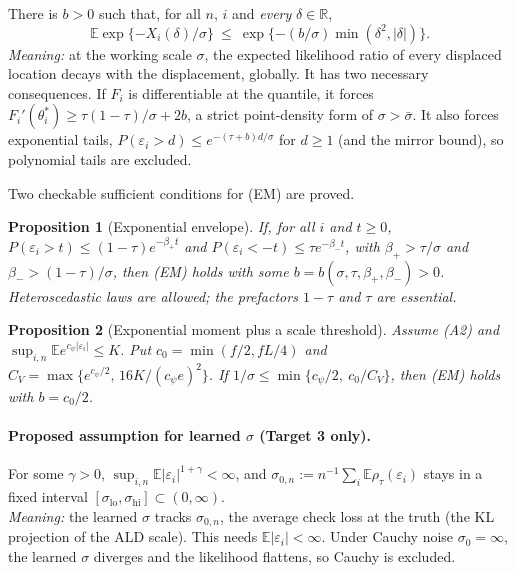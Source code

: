 \documentclass[11pt]{article}
\newcommand{\R}{\mathbb{R}}
\newcommand{\E}{\mathbb{E}}
\newcommand{\sbar}{\bar\sigma}
\theoremstyle{plain}
\newtheorem{proposition}{Proposition}
\theoremstyle{definition}
\theoremstyle{remark}
\begin{document}
\begin{description}[leftmargin=0pt, itemsep=5pt]
\item[(EM) Light tails.] There is $b>0$ such that, for all $n$, $i$ and \emph{every} $\delta\in\R$,
\[
\E\exp\{-X_i(\delta)/\sigma\} \ \le\ \exp\{-(b/\sigma)\min(\delta^2,|\delta|)\}.
\]
\textit{Meaning:} at the working scale $\sigma$, the expected likelihood ratio of every displaced location decays with the displacement, globally. It has two necessary consequences. If $F_i$ is differentiable at the quantile, it forces $F_i'(\theta^*_i)\ge\tau(1-\tau)/\sigma+2b$, a strict point-density form of $\sigma>\sbar$. It also forces exponential tails, $P(\varepsilon_i>d)\le e^{-(\tau+b)d/\sigma}$ for $d\ge1$ (and the mirror bound), so polynomial tails are excluded.
\end{description}

\noindent Two checkable sufficient conditions for (EM) are proved.

\begin{proposition}[Exponential envelope]
If, for all $i$ and $t\ge0$, $P(\varepsilon_i>t)\le(1-\tau)e^{-\beta_+t}$ and $P(\varepsilon_i<-t)\le\tau e^{-\beta_-t}$, with $\beta_+>\tau/\sigma$ and $\beta_->(1-\tau)/\sigma$, then (EM) holds with some $b=b(\sigma,\tau,\beta_+,\beta_-)>0$. Heteroscedastic laws are allowed; the prefactors $1-\tau$ and $\tau$ are essential.
\end{proposition}

\begin{proposition}[Exponential moment plus a scale threshold]
Assume (A2) and $\sup_{i,n}\E e^{c_\psi|\varepsilon_i|}\le K$. Put $c_0=\min(f/2,fL/4)$ and $C_V=\max\{e^{c_\psi/2},\,16K/(c_\psi e)^2\}$. If $1/\sigma\le\min\{c_\psi/2,\ c_0/C_V\}$, then (EM) holds with $b=c_0/2$.
\end{proposition}

\paragraph{Proposed assumption for learned $\sigma$ (Target 3 only).}
\begin{description}[leftmargin=0pt]
\item[(M) First moment.] For some $\gamma>0$, $\sup_{i,n}\E|\varepsilon_i|^{1+\gamma}<\infty$, and $\sigma_{0,n}:=n^{-1}\sum_i\E\rho_\tau(\varepsilon_i)$ stays in a fixed interval $[\sigma_{\mathrm{lo}},\sigma_{\mathrm{hi}}]\subset(0,\infty)$.\\
\textit{Meaning:} the learned $\sigma$ tracks $\sigma_{0,n}$, the average check loss at the truth (the KL projection of the ALD scale). This needs $\E|\varepsilon_i|<\infty$. Under Cauchy noise $\sigma_0=\infty$, the learned $\sigma$ diverges and the likelihood flattens, so Cauchy is excluded.
\end{description}
\end{document}
